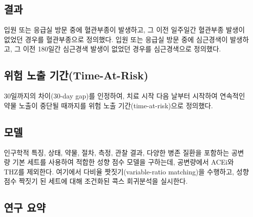 \documentclass[11pt]{book}
\theoremstyle{definition}
\theoremstyle{definition}
\theoremstyle{definition}
\theoremstyle{remark}
\begin{document}
\subsection{결과}\label{-1}

입원 또는 응급실 방문 중에 혈관부종이 발생하고, 그 이전 일주일간
혈관부종 발생이 없었던 경우를 혈관부종으로 정의했다. 입원 또는 응급실
방문 중에 심근경색이 발생하고, 그 이전 180일간 심근경색 발생이 없었던
경우를 심근경색으로 정의했다.

\subsection{위험 노출 기간(Time-At-Risk)}\label{--time-at-risk}

30일까지의 차이(30-day gap)를 인정하여, 치료 시작 다음 날부터 시작하여
연속적인 약물 노출이 중단될 때까지를 위험 노출 기간(time-at-risk)으로
정의했다.

\subsection{모델}

인구학적 특징, 상태, 약물, 절차, 측정, 관찰 결과, 다양한 병존 질환을
포함하는 공변량 기본 세트를 사용하여 적합한 성향 점수 모델을 구하는데,
공변량에서 ACEi와 THZ를 제외한다. 여기에서 다비율 짯짓기(variable-ratio
matching)을 수행하고, 성향 점수 짝짓기 된 세트에 대해 조건화된 콕스
회귀분석을 실시한다.

\subsection{연구 요약}\label{-}
\end{document}

